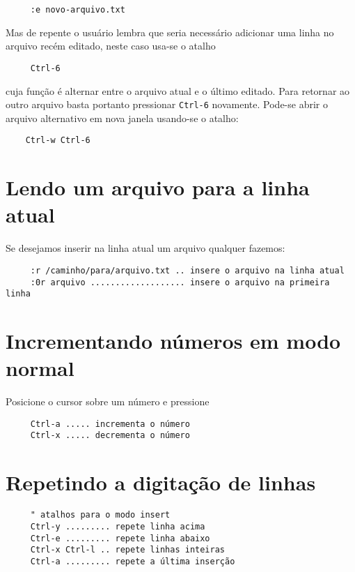 \begin{verbatim}
     :e novo-arquivo.txt
\end{verbatim}

Mas de repente o usuário lembra que seria necessário adicionar uma linha no
arquivo recém editado, neste caso usa-se o atalho

\begin{verbatim}
     Ctrl-6
\end{verbatim}

cuja função é alternar entre o arquivo atual e o último editado. Para retornar
ao outro arquivo basta portanto pressionar \verb|Ctrl-6| novamente. Pode-se 
abrir o arquivo alternativo em nova janela usando-se o atalho:

\begin{verbatim}
    Ctrl-w Ctrl-6
\end{verbatim}

\section{Lendo um arquivo para a linha atual}
\label{sec:Lendo um arquivo para a linha atual}

Se desejamos inserir na linha atual um arquivo qualquer fazemos:

\begin{verbatim}
	 :r /caminho/para/arquivo.txt .. insere o arquivo na linha atual
	 :0r arquivo ................... insere o arquivo na primeira linha
\end{verbatim}


\section{Incrementando números em modo normal}\label{Incrementando números em modo normal}

Posicione o cursor sobre um número e pressione

\begin{verbatim}
     Ctrl-a ..... incrementa o número
     Ctrl-x ..... decrementa o número
\end{verbatim}

\section{Repetindo a digitação de linhas}
\label{Repetindo a digitação de linhas}

\begin{verbatim}
     " atalhos para o modo insert
     Ctrl-y ......... repete linha acima
     Ctrl-e ......... repete linha abaixo
     Ctrl-x Ctrl-l .. repete linhas inteiras
     Ctrl-a ......... repete a última inserção
\end{verbatim}

